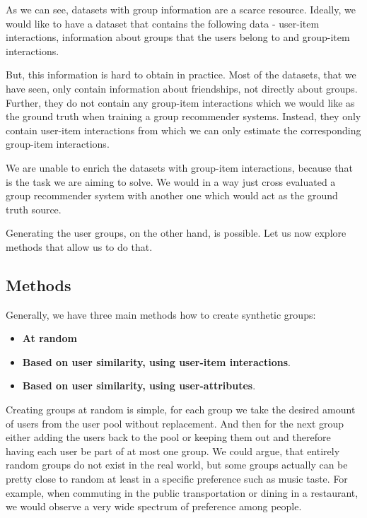 As we can see, datasets with group information are a scarce resource. Ideally, we would like to have a dataset that contains the following data - user-item interactions, information about groups that the users belong to and group-item interactions.

But, this information is hard to obtain in practice. Most of the datasets, that we have seen, only contain information about friendships, not directly about groups. Further, they do not contain any group-item interactions which we would like as the ground truth when training a group recommender systems. Instead, they only contain user-item interactions from which we can only estimate the corresponding group-item interactions.

We are unable to enrich the datasets with group-item interactions, because that is the task we are aiming to solve. We would in a way just cross evaluated a group recommender system with another one which would act as the ground truth source.

Generating the user groups, on the other hand, is possible. Let us now explore methods that allow us to do that.

\subsection{Methods}

Generally, we have three main methods how to create synthetic groups:
\begin{itemize}
    \item \textbf{At random}
    \item \textbf{Based on user similarity, using user-item interactions}.
    \item \textbf{Based on user similarity, using user-attributes}.
\end{itemize}

Creating groups at random is simple, for each group we take the desired amount of users from the user pool without replacement. And then for the next group either adding the users back to the pool or keeping them out and therefore having each user be part of at most one group. We could argue, that entirely random groups do not exist in the real world, but some groups actually can be pretty close to random at least in a specific preference such as music taste. For example, when commuting in the public transportation or dining in a restaurant, we would observe a very wide spectrum of preference among people.

